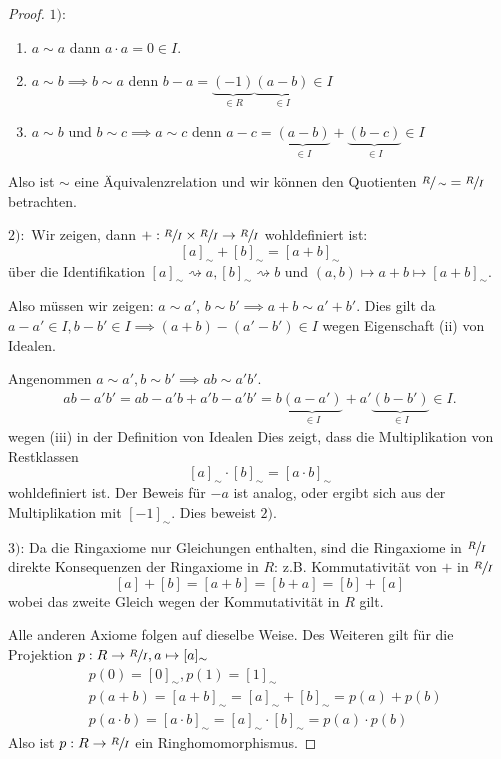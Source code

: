 \begin{proof}
	$1):$ \begin{enumerate}
		\item $a \sim a$ dann $a\cdot a = 0 \in I$.\\
		\item$a \sim b \implies b \sim a$ denn $b-a = \underbrace{(-1)}_{\in R}\underbrace{(a-b)}_{\in I} \in I$\\
		\item $a \sim b$ und $b \sim c \implies a \sim c$ denn $a-c = \underbrace{(a-b)}_{\in I} + \underbrace{(b-c)}_{\in I} \in I$
	\end{enumerate}
	Also ist $\sim$ eine Äquivalenzrelation und wir können den Quotienten $\sfrac{R}{\sim} = \sfrac{R}{I}$ betrachten.

	$2):$
	Wir zeigen, dann $+: \sfrac{R}{I} \times \sfrac{R}{I} \to \sfrac{R}{I}$ wohldefiniert ist:
	\[
		[ a ]_{\sim} + [ b ]_{\sim} = [ a+b ]_{\sim}
	\]
	über die Identifikation $[ a ]_{\sim} \rightsquigarrow a, [ b ]_{\sim} \rightsquigarrow b$ und $(a,b) \mapsto a+b \mapsto [ a+b ]_{\sim}$.

	Also müssen wir zeigen: $a \sim a'$, $b \sim b' \implies a+b \sim a' + b'$. Dies gilt da
	$a-a' \in I, b-b' \in I \implies (a+b) - (a'-b') \in I$ wegen Eigenschaft (ii) von Idealen. 

	Angenommen $a \sim a', b \sim b' \implies ab \sim a'b'$.
	\begin{align*}
		ab - a'b' = ab - a'b + a'b - a'b' = b \underbrace{(a-a')}_{\in I} + a'\underbrace{(b-b')}_{\in I} \in I
	.\end{align*}
	wegen (iii) in der Definition von Idealen
	Dies zeigt, dass die Multiplikation von Restklassen
	\[
		[a]_{\sim} \cdot [b]_{\sim} = [a\cdot b]_{\sim}
	\] 
	wohldefiniert ist.
	Der Beweis für $-a$ ist analog, oder ergibt sich aus der Multiplikation mit $[-1]_{\sim}$.
	Dies beweist $2)$.

	$3)$: Da die Ringaxiome nur Gleichungen enthalten, sind die Ringaxiome in $\sfrac{R}{I}$ direkte Konsequenzen der Ringaxiome in $R$:
	z.B. Kommutativität von $+$ in $\sfrac{R}{I}$
	\[
		 [a] + [b] = [a+b] = [b+a] = [b] + [a]
	\] 
	wobei das zweite Gleich wegen der Kommutativität in $R$ gilt.

	Alle anderen Axiome folgen auf dieselbe Weise. 
	Des Weiteren gilt für die Projektion $p: R \to \sfrac{R}{I}, a \mapsto [a]_{\sim}$ 
	\begin{align*}
		&p(0) = [0]_{\sim}, p(1) = [1]_{\sim}\\
		&p(a+b) = [a+b]_{\sim} = [a]_{\sim} + [b]_{\sim} = p(a) + p(b)\\
		&p(a\cdot b) = [a\cdot b]_{\sim} = [a]_{\sim} \cdot [b]_{\sim} = p(a)\cdot p(b)
	\end{align*}
	Also ist $p: R \to \sfrac{R}{I}$ ein Ringhomomorphismus.
\end{proof}

